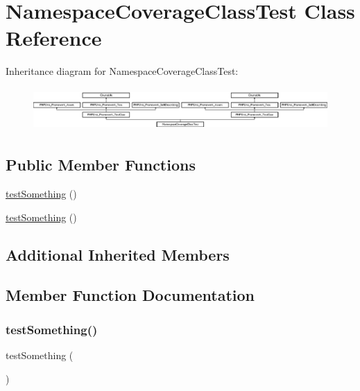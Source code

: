 \hypertarget{class_namespace_coverage_class_test}{}\section{Namespace\+Coverage\+Class\+Test Class Reference}
\label{class_namespace_coverage_class_test}
Inheritance diagram for Namespace\+Coverage\+Class\+Test\+:\begin{figure}[H]
\begin{center}
\leavevmode
\includegraphics[height=1.651917cm]{class_namespace_coverage_class_test}
\end{center}
\end{figure}
\subsection*{Public Member Functions}
\begin{DoxyCompactItemize}
\item 
\mbox{\hyperlink{class_namespace_coverage_class_test_a0fc4e17369bc9607ebdd850d9eda8167}{test\+Something}} ()
\item 
\mbox{\hyperlink{class_namespace_coverage_class_test_a0fc4e17369bc9607ebdd850d9eda8167}{test\+Something}} ()
\end{DoxyCompactItemize}
\subsection*{Additional Inherited Members}


\subsection{Member Function Documentation}
\mbox{\label{class_namespace_coverage_class_test_a0fc4e17369bc9607ebdd850d9eda8167}} 
\subsubsection{\texorpdfstring{test\+Something()}{testSomething()}\hspace{0.1cm}{\footnotesize\ttfamily [1/2]}}
{\footnotesize\ttfamily test\+Something (\begin{DoxyParamCaption}{ }\end{DoxyParamCaption})}

